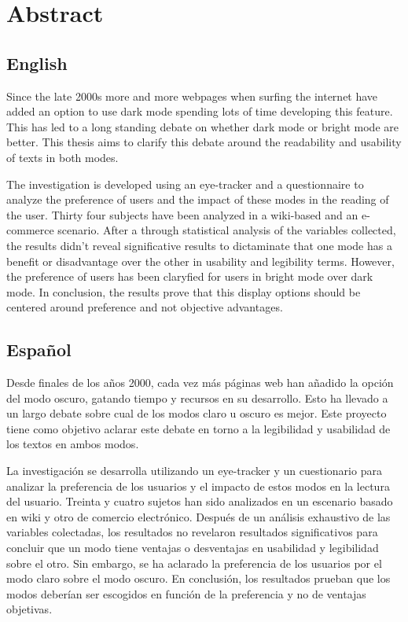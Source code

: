 \chapter{Abstract}
\label{chap:abstract}
\section{English}
Since the late 2000s more and more webpages when surfing the internet have added an option to use dark mode spending lots of time
developing this feature. This has led to a long standing debate on whether dark mode or bright mode are better. This 
thesis aims to clarify this debate around the readability and usability of texts in both modes.

The investigation is developed using an eye-tracker and a questionnaire to analyze the preference of users and the 
impact of these modes in the reading of the user. Thirty four subjects have been analyzed in a wiki-based and an e-commerce scenario.
After a through statistical analysis of the variables collected, the results didn't reveal significative results to dictaminate
that one mode has a benefit or disadvantage over the other in usability and legibility terms. However, the preference of users 
has been claryfied for users in bright mode over dark mode.
In conclusion, the results prove that this display options should be centered around preference and not objective advantages.
\newpage
\section{Español}
Desde finales de los años 2000, cada vez más páginas web han añadido la opción del modo oscuro, gatando tiempo y 
recursos en su desarrollo. Esto ha llevado a un largo debate sobre cual de los modos claro u oscuro es mejor. 
Este proyecto tiene como objetivo aclarar este debate en torno a la legibilidad y usabilidad de los textos en ambos modos. 

La investigación se desarrolla utilizando un eye-tracker y un cuestionario para analizar la preferencia de los usuarios y el impacto de estos
modos en la lectura del usuario. Treinta y cuatro sujetos han sido analizados en un escenario basado en wiki y otro de comercio electrónico. 
Después de un análisis exhaustivo de las variables colectadas, los resultados no revelaron resultados significativos para concluir que un 
modo tiene ventajas o desventajas en usabilidad y legibilidad sobre el otro. Sin embargo, se ha aclarado la preferencia de los usuarios por el 
modo claro sobre el modo oscuro. En conclusión, los resultados prueban que los modos deberían ser escogidos en función de la preferencia y no de ventajas objetivas.